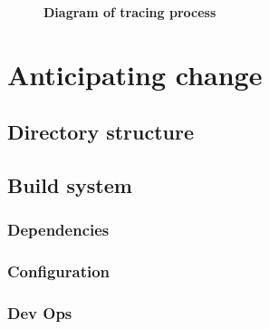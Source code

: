 \begin{figure}
\centering
\resizebox{1.0\textwidth}{!}{}
\caption[Diagram of tracing process]{\textbf{Diagram of tracing process}}\label{fig:proc-tracing}
\end{figure}



\section{Anticipating change}


\subsection{Directory structure}

\begin{description}[font=\computertextfamily\textpluscolon]
\item[lib]
\item[lib/t]
\item[src]
\end{description}


\subsection{Build system}


\subsubsection{Dependencies}


\subsubsection{Configuration}


\subsubsection{Dev Ops}

